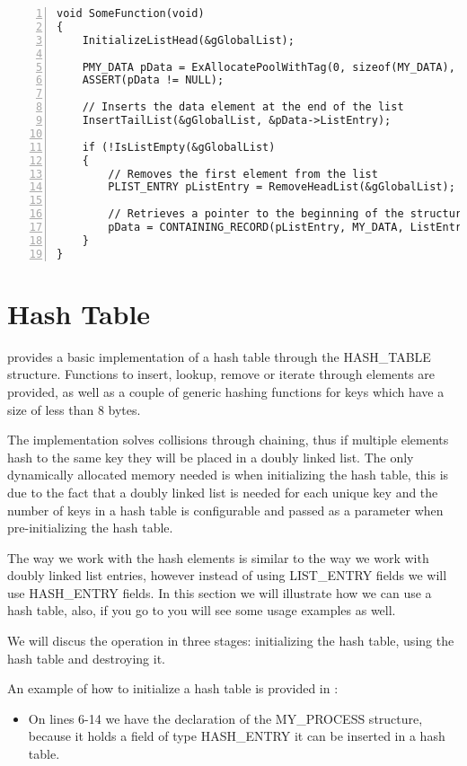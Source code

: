 \begin{appendices}
\begin{lstlisting}[caption={List Usage Example},label={lst:ListExample},numbers=left]
void SomeFunction(void)
{
	InitializeListHead(&gGlobalList);

	PMY_DATA pData = ExAllocatePoolWithTag(0, sizeof(MY_DATA), HEAP_TEST_TAG, 0);
	ASSERT(pData != NULL);

	// Inserts the data element at the end of the list
	InsertTailList(&gGlobalList, &pData->ListEntry);

	if (!IsListEmpty(&gGlobalList)
	{
		// Removes the first element from the list
		PLIST_ENTRY pListEntry = RemoveHeadList(&gGlobalList);

		// Retrieves a pointer to the beginning of the structure
		pData = CONTAINING_RECORD(pListEntry, MY_DATA, ListEntry);
	}
}
\end{lstlisting}

\section{Hash Table}

\projectname provides a basic implementation of a hash table through the HASH\_TABLE structure.
Functions to insert, lookup, remove or iterate through elements are provided, as well as a couple of
generic hashing functions for keys which have a size of less than 8 bytes.

The implementation solves collisions through chaining, thus if multiple elements hash to the same
key they will be placed in a doubly linked list. The only dynamically allocated memory needed is
when initializing the hash table, this is due to the fact that a doubly linked list is needed for
each unique key and the number of keys in a hash table is configurable and passed as a parameter
when pre-initializing the hash table.

The way we work with the hash elements is similar to the way we work with doubly linked list entries,
however instead of using LIST\_ENTRY fields we will use HASH\_ENTRY fields. In this section we will
illustrate how we can use a hash table, also, if you go to  you will
see some usage examples as well.

We will discus the operation in three stages: initializing the hash table, using the hash table and
destroying it.

An example of how to initialize a hash table is provided in :
\begin{itemize}
	\item On lines 6-14 we have the declaration of the MY\_PROCESS structure, because it holds a
	field of type HASH\_ENTRY it can be inserted in a hash table.
	

\end{itemize}
\end{appendices}
